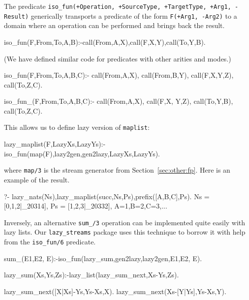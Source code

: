 \documentclass{new_tlp}
\begin{document}
The predicate 
{\tt iso\_fun(+Operation, +SourceType, +TargetType, +Arg1, -Result)}
generically transports a predicate of the form {\tt F(+Arg1, -Arg2)} to a domain where
an operation can be performed and brings back the result.

\begin{code}
iso_fun(F,From,To,A,B):-call(From,A,X),call(F,X,Y),call(To,Y,B).
\end{code}
(We have defined similar code for predicates with other arities and modes.)

\begin{codeh}
%
iso_fun(F,From,To,A,B,C):-
  call(From,A,X),
  call(From,B,Y),
  call(F,X,Y,Z),
  call(To,Z,C).

%
iso_fun_(F,From,To,A,B,C):- 
  call(From,A,X),
  call(F,X, Y,Z), %
  call(To,Y,B),
  call(To,Z,C).
\end{codeh}

This allows us to define lazy version of {\tt maplist}:
\begin{code}
lazy_maplist(F,LazyXs,LazyYs):-iso_fun(map(F),lazy2gen,gen2lazy,LazyXs,LazyYs).
\end{code}
where {\tt map/3} is the stream generator from Section~\ref{sec:other:fp}. Here
is an example of the result.
\begin{codex}
?- lazy_nats(Ns),lazy_maplist(succ,Ns,Ps),prefix([A,B,C],Ps).
Ns = [0,1,2|_20314], Ps = [1,2,3|_20332], A=1,B=2,C=3,...
\end{codex}

Inversely, an alternative {\tt sum\_/3} operation  can be implemented 
quite easily with lazy lists. Our {\tt lazy\_streams} package 
uses this technique to borrow it with help from the {\tt iso\_fun/6} predicate.
\begin{code}
sum_(E1,E2, E):-iso_fun(lazy_sum,gen2lazy,lazy2gen,E1,E2, E).

lazy_sum(Xs,Ys,Zs):-lazy_list(lazy_sum_next,Xs-Ys,Zs).
  
lazy_sum_next([X|Xs]-Ys,Ys-Xs,X).
lazy_sum_next(Xs-[Y|Ys],Ys-Xs,Y).
\end{code}
\end{document}
